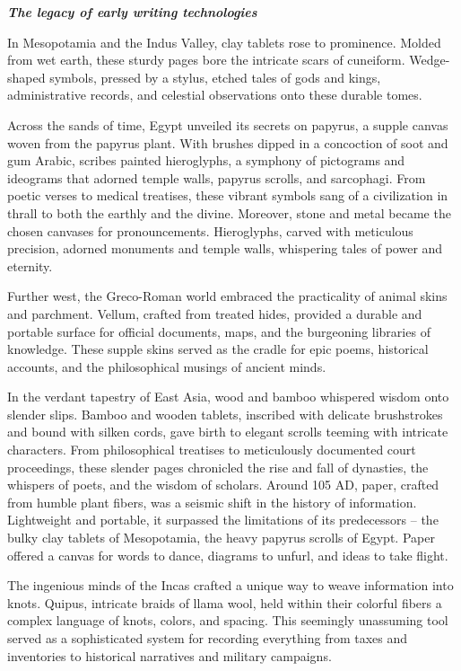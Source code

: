 \documentclass[
  letterpaper,
  DIV=11,
  numbers=noendperiod]{scrreprt}
\begin{document}
\textbf{\emph{The legacy of early writing technologies}}

In Mesopotamia and the Indus Valley, clay tablets rose to prominence.
Molded from wet earth, these sturdy pages bore the intricate scars of
cuneiform. Wedge-shaped symbols, pressed by a stylus, etched tales of
gods and kings, administrative records, and celestial observations onto
these durable tomes.

Across the sands of time, Egypt unveiled its secrets on papyrus, a
supple canvas woven from the papyrus plant. With brushes dipped in a
concoction of soot and gum Arabic, scribes painted hieroglyphs, a
symphony of pictograms and ideograms that adorned temple walls, papyrus
scrolls, and sarcophagi. From poetic verses to medical treatises, these
vibrant symbols sang of a civilization in thrall to both the earthly and
the divine. Moreover, stone and metal became the chosen canvases for
pronouncements. Hieroglyphs, carved with meticulous precision, adorned
monuments and temple walls, whispering tales of power and eternity.

Further west, the Greco-Roman world embraced the practicality of animal
skins and parchment. Vellum, crafted from treated hides, provided a
durable and portable surface for official documents, maps, and the
burgeoning libraries of knowledge. These supple skins served as the
cradle for epic poems, historical accounts, and the philosophical
musings of ancient minds.

In the verdant tapestry of East Asia, wood and bamboo whispered wisdom
onto slender slips. Bamboo and wooden tablets, inscribed with delicate
brushstrokes and bound with silken cords, gave birth to elegant scrolls
teeming with intricate characters. From philosophical treatises to
meticulously documented court proceedings, these slender pages
chronicled the rise and fall of dynasties, the whispers of poets, and
the wisdom of scholars. Around 105 AD, paper, crafted from humble plant
fibers, was a seismic shift in the history of information. Lightweight
and portable, it surpassed the limitations of its predecessors -- the
bulky clay tablets of Mesopotamia, the heavy papyrus scrolls of Egypt.
Paper offered a canvas for words to dance, diagrams to unfurl, and ideas
to take flight.

The ingenious minds of the Incas crafted a unique way to weave
information into knots. Quipus, intricate braids of llama wool, held
within their colorful fibers a complex language of knots, colors, and
spacing. This seemingly unassuming tool served as a sophisticated system
for recording everything from taxes and inventories to historical
narratives and military campaigns.
\end{document}
